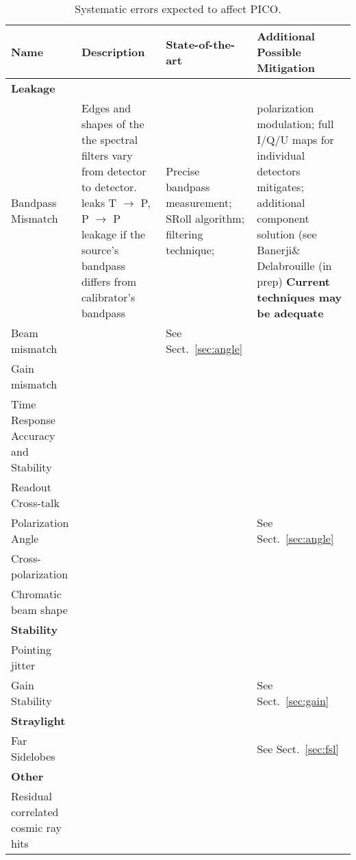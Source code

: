 \documentclass[PICOReport.tex]{subfiles}
\begin{document}
\begin{table}[h!]
\centering
\scriptsize
 \begin{tabular}{p{4.1cm} p{4.1cm} p{4.1cm} p{4.1cm}}
 \hline
\textbf{Name} & \textbf{Description} & \textbf{State-of-the-art} & \textbf{Additional Possible Mitigation} \\
 \hline
\textbf{Leakage} & &\\
 Bandpass Mismatch & 
 Edges and shapes of the the spectral filters vary from detector to detector. leaks T $\to$ P, P $\to$ P leakage if the source's bandpass differs from calibrator's bandpass\cite{Hoang_2017} & Precise bandpass measurement\cite{Pajot_2010};
SRoll algorithm\cite{Planck_Lowell}; filtering technique\cite{CORE_systematics};   &
polarization modulation; full I/Q/U maps for individual detectors
                                                                                     mitigates;
                                                                                     additional
                                                                                     component
                                                                                     solution
                                                                                     (see
                                                                                     Banerji\&
                                                                                              Delabrouille
                                                                                               (in
                                                                                             prep)
                                                                                               \textbf{Current
                                                                                     techniques may be adequate}  \\
Beam mismatch & & See Sect.~\ref{sec:angle}
\\
Gain mismatch &
\\
Time Response Accuracy and Stability  &
\\
Readout Cross-talk & &
\\
Polarization Angle & & &
See Sect.~\ref{sec:angle}
\\

Cross-polarization &
\\
Chromatic beam shape
\\
\hline 
\textbf{Stability} & & \\

Pointing jitter
\\

Gain Stability & & &
See Sect.~\ref{sec:gain}
\\
\hline
\textbf{Straylight} & & \\
Far Sidelobes& & &
See Sect.~\ref{sec:fsl}\\
 \hline
\textbf{Other} \\
Residual correlated cosmic ray hits &
\\
\hline
 \end{tabular}
\caption{\label{tbl:SystematicsList} Systematic errors expected to affect PICO.}
 \end{table}
\end{document}
